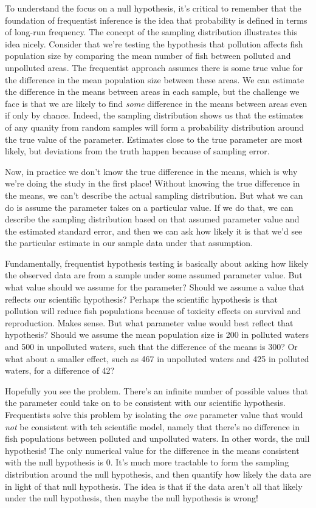\documentclass[
]{book}
\begin{document}
To understand the focus on a null hypothesis, it's critical to remember that the foundation of frequentist inference is the idea that probability is defined in terms of long-run frequency. The concept of the sampling distribution illustrates this idea nicely. Consider that we're testing the hypothesis that pollution affects fish population size by comparing the mean number of fish between polluted and unpolluted areas. The frequentist approach assumes there is some true value for the difference in the mean population size between these areas. We can estimate the difference in the means between areas in each sample, but the challenge we face is that we are likely to find \emph{some} difference in the means between areas even if only by chance. Indeed, the sampling distribution shows us that the estimates of any quanity from random samples will form a probability distribution around the true value of the parameter. Estimates close to the true parameter are most likely, but deviations from the truth happen because of sampling error.

Now, in practice we don't know the true difference in the means, which is why we're doing the study in the first place! Without knowing the true difference in the means, we can't describe the actual sampling distribution. But what we can do is assume the parameter takes on a particular value. If we do that, we can describe the sampling distribution based on that assumed parameter value and the estimated standard error, and then we can ask how likely it is that we'd see the particular estimate in our sample data under that assumption.

Fundamentally, frequentist hypothesis testing is basically about asking how likely the observed data are from a sample under some assumed parameter value. But what value should we assume for the parameter? Should we assume a value that reflects our scientific hypothesis? Perhaps the scientific hypothesis is that pollution will reduce fish populations because of toxicity effects on survival and reproduction. Makes sense. But what parameter value would best reflect that hypothesis? Should we assume the mean population size is 200 in polluted waters and 500 in unpolluted waters, such that the difference of the means is 300? Or what about a smaller effect, such as 467 in unpolluted waters and 425 in polluted waters, for a difference of 42?

Hopefully you see the problem. There's an infinite number of possible values that the parameter could take on to be consistent with our scientific hypothesis. Frequentists solve this problem by isolating the \emph{one} parameter value that would \emph{not} be consistent with teh scientific model, namely that there's no difference in fish populations between polluted and unpolluted waters. In other words, the null hypothesis! The only numerical value for the difference in the means consistent with the null hypothesis is 0. It's much more tractable to form the sampling distribution around the null hypothesis, and then quantify how likely the data are in light of that null hypothesis. The idea is that if the data aren't all that likely under the null hypothesis, then maybe the null hypothesis is wrong!
\end{document}
